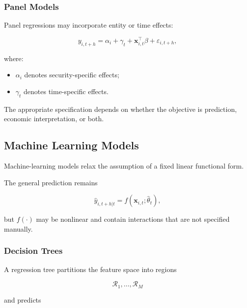 \documentclass[11pt,a4paper]{article}
\begin{document}
\subsubsection{Panel Models}

Panel regressions may incorporate entity or time effects:

\begin{equation}
y_{i,t+h}
=
\alpha_i
+
\gamma_t
+
\mathbf{x}_{i,t}^{\top}\beta
+
\varepsilon_{i,t+h},
\end{equation}

where:

\begin{itemize}
    \item $\alpha_i$ denotes security-specific effects;
    \item $\gamma_t$ denotes time-specific effects.
\end{itemize}

The appropriate specification depends on whether the objective is prediction,
economic interpretation, or both.


\subsection{Machine Learning Models}
\label{subsec:machine_learning_models}

Machine-learning models relax the assumption of a fixed linear functional form.

The general prediction remains

\begin{equation}
\widehat{y}_{i,t+h|t}
=
f
\left(
\mathbf{x}_{i,t};
\widehat{\theta}_t
\right),
\end{equation}

but $f(\cdot)$ may be nonlinear and contain interactions that are not specified
manually.


\subsubsection{Decision Trees}

A regression tree partitions the feature space into regions

\begin{equation}
\mathcal{R}_1,
\ldots,
\mathcal{R}_M
\end{equation}

and predicts
\end{document}
